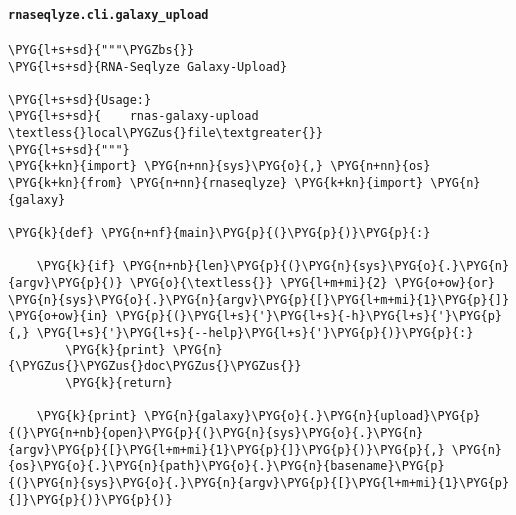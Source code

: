 \paragraph{\texttt{rnaseqlyze.cli.galaxy\_upload}}
\label{index-pdf4:rnaseqlyze-cli-galaxy-upload}
\begin{Verbatim}[commandchars=\\\{\}]
\PYG{l+s+sd}{"""\PYGZbs{}}
\PYG{l+s+sd}{RNA-Seqlyze Galaxy-Upload}

\PYG{l+s+sd}{Usage:}
\PYG{l+s+sd}{    rnas-galaxy-upload \textless{}local\PYGZus{}file\textgreater{}}
\PYG{l+s+sd}{"""}
\PYG{k+kn}{import} \PYG{n+nn}{sys}\PYG{o}{,} \PYG{n+nn}{os}
\PYG{k+kn}{from} \PYG{n+nn}{rnaseqlyze} \PYG{k+kn}{import} \PYG{n}{galaxy}

\PYG{k}{def} \PYG{n+nf}{main}\PYG{p}{(}\PYG{p}{)}\PYG{p}{:}

    \PYG{k}{if} \PYG{n+nb}{len}\PYG{p}{(}\PYG{n}{sys}\PYG{o}{.}\PYG{n}{argv}\PYG{p}{)} \PYG{o}{\textless{}} \PYG{l+m+mi}{2} \PYG{o+ow}{or} \PYG{n}{sys}\PYG{o}{.}\PYG{n}{argv}\PYG{p}{[}\PYG{l+m+mi}{1}\PYG{p}{]} \PYG{o+ow}{in} \PYG{p}{(}\PYG{l+s}{'}\PYG{l+s}{-h}\PYG{l+s}{'}\PYG{p}{,} \PYG{l+s}{'}\PYG{l+s}{--help}\PYG{l+s}{'}\PYG{p}{)}\PYG{p}{:}
        \PYG{k}{print} \PYG{n}{\PYGZus{}\PYGZus{}doc\PYGZus{}\PYGZus{}}
        \PYG{k}{return}

    \PYG{k}{print} \PYG{n}{galaxy}\PYG{o}{.}\PYG{n}{upload}\PYG{p}{(}\PYG{n+nb}{open}\PYG{p}{(}\PYG{n}{sys}\PYG{o}{.}\PYG{n}{argv}\PYG{p}{[}\PYG{l+m+mi}{1}\PYG{p}{]}\PYG{p}{)}\PYG{p}{,} \PYG{n}{os}\PYG{o}{.}\PYG{n}{path}\PYG{o}{.}\PYG{n}{basename}\PYG{p}{(}\PYG{n}{sys}\PYG{o}{.}\PYG{n}{argv}\PYG{p}{[}\PYG{l+m+mi}{1}\PYG{p}{]}\PYG{p}{)}\PYG{p}{)}
\end{Verbatim}


